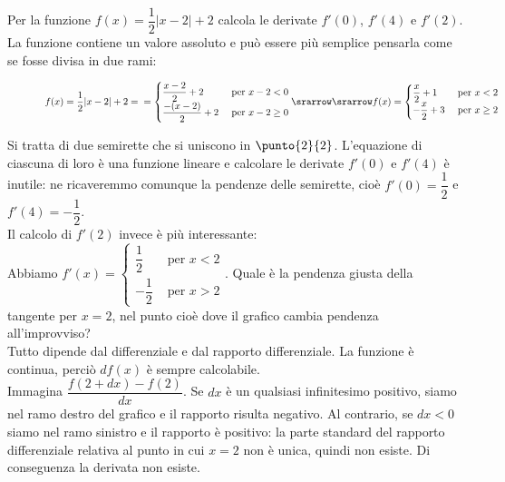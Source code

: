 \begin{esempio}
 Per la funzione $f(x)=\dfrac{1}{2}|x-2|+2$ calcola le derivate $f'(0)$, 
$f'(4)$
 e $f'(2)$.\\
 La funzione contiene un valore assoluto e può essere più semplice pensarla 
 come se fosse divisa in due rami:

\begin{figure}[h!]
\begin{inaccessibleblock}
 \begin{center}
 \begin{minipage}[]{.40 \textwidth}
  \derivavalass
  \caption{}
 \end{minipage} 
 \hfill
 \begin{minipage}[]{.58 \textwidth}
$f(x)= \dfrac{1}{2}|x-2|+2=\\
=\begin{cases}
  \dfrac{x-2}{2}+2 &\text{ per } x-2< 0  \\
 \dfrac{-(x-2)}{2}+2 &\text{ per } x-2 \ge 0
\end{cases} 
\srarrow\\
\srarrow f(x)= \begin{cases}
 \dfrac{x}{2}+1 &\text{ per } x<2 \\
 -\dfrac{x}{2}+3 &\text{ per } x\ge 2
\end{cases}$
\end{minipage}
\end{center}
\end{inaccessibleblock}
\label{}
\end{figure} 

Si tratta di due semirette che si uniscono in $\punto{2}{2}$. L'equazione
di ciascuna di loro è una funzione lineare e calcolare le derivate $f'(0)$
e $f'(4)$ è inutile: ne ricaveremmo comunque la pendenze delle semirette, 
cioè
$f'(0)=\dfrac{1}{2}$ e $f'(4)=-\dfrac{1}{2}$.\\
Il calcolo di $f'(2)$ invece è più interessante:\\
Abbiamo
$f'(x)= \begin{cases}
 \dfrac{1}{2} &\text{ per } x<2 \\
 -\dfrac{1}{2} &\text{ per } x > 2
\end{cases}$.
Quale è la pendenza giusta della tangente per
$x=2$, nel punto cioè dove il grafico cambia pendenza all'improvviso?\\
Tutto dipende dal differenziale e dal rapporto differenziale.
La funzione è continua, perciò $df(x)$ è sempre calcolabile.\\
Immagina $\dfrac{f(2+dx)-f(2)}{dx}$.
Se $dx$ è un qualsiasi infinitesimo positivo, siamo nel ramo destro del 
grafico
e il rapporto risulta negativo. Al contrario, se $dx<0$ siamo nel ramo
sinistro e il rapporto è positivo: la parte standard del rapporto 
differenziale
relativa al punto in cui $x=2$ non è unica, quindi non esiste.
Di conseguenza la derivata non esiste.
\end{esempio}

